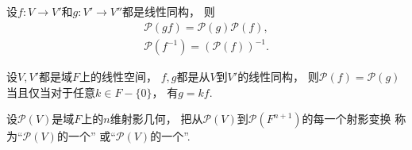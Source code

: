 \begin{property}%
设\(f\colon V \to V'\)和\(g\colon V' \to V''\)都是线性同构，
则\begin{gather*}
	\mathcal{P}(gf) = \mathcal{P}(g) \mathcal{P}(f), \\
	\mathcal{P}(f^{-1}) = (\mathcal{P}(f))^{-1}.
\end{gather*}
\end{property}

\begin{theorem}%
设\(V,V'\)都是域\(F\)上的线性空间，
\(f,g\)都是从\(V\)到\(V'\)的线性同构，
则\(\mathcal{P}(f) = \mathcal{P}(g)\)
当且仅当对于任意\(k \in F - \{0\}\)，
有\(g = k f\).
\end{theorem}

\begin{definition}
设\(\mathcal{P}(V)\)是域\(F\)上的\(n\)维射影几何，
把从\(\mathcal{P}(V)\)到\(\mathcal{P}(F^{n+1})\)的每一个射影变换
称为“\(\mathcal{P}(V)\)的一个”
或“\(\mathcal{P}(V)\)的一个”.
\end{definition}
